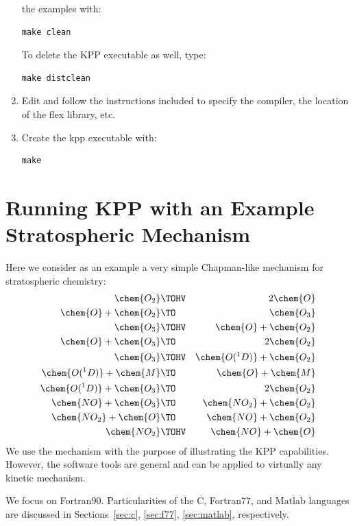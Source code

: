 \documentclass[twoside]{article}
\begin{document}
\begin{enumerate}
  the examples with:
\begin{verbatim}
make clean
\end{verbatim}
To delete the KPP executable as well, type:
\begin{verbatim}
make distclean
\end{verbatim}
\item Edit  and follow the instructions included to
  specify the compiler, the location of the flex library, etc.
\item Create the kpp executable with:
\begin{verbatim}
make
\end{verbatim}
\end{enumerate}

\section{Running KPP with an Example Stratospheric Mechanism}
\label{sec:model}

Here we consider as an example a very simple Chapman-like mechanism for
stratospheric chemistry:
%
\begin{eqnarray}
\chem{O_2}                 & \TOHV & 2 \chem{O}\\
\chem{O} + \chem{O_2}      & \TO   & \chem{O_3}\\
\chem{O_3}                 & \TOHV & \chem{O} + \chem{O_2}\\
\chem{O} + \chem{O_3}      & \TO   & 2 \chem{O_2}\\
\chem{O_3}                 & \TOHV & \chem{O(^1D)} + \chem{O_2}\\
\chem{O(^1D)} + \chem{M}   & \TO   & \chem{O} + \chem{M}\\
\chem{O(^1D)} + \chem{O_3} & \TO   & 2 \chem{O_2}\\
\chem{NO} + \chem{O_3}     & \TO   & \chem{NO_2} + \chem{O_2}\\
\chem{NO_2} + \chem{O}     & \TO   & \chem{NO} + \chem{O_2}\\
\chem{NO_2}                & \TOHV & \chem{NO} + \chem{O}
\end{eqnarray}
%
We use the mechanism with the purpose of illustrating the KPP
capabilities. However, the software tools are general and can be applied
to virtually any kinetic mechanism.

We focus on Fortran90. Particularities of the C, Fortran77, and Matlab
languages are discussed in Sections~\ref{sec:c}, \ref{sec:f77},
\ref{sec:matlab}, respectively.
\end{document}

